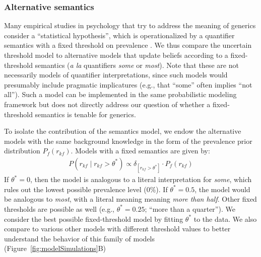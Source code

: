\documentclass[floatsintext,man]{apa6}
\newcommand{\ndg}[1]{{\textcolor{Green}{[ndg: #1]}}}
\begin{document}
\subsubsection{Alternative semantics}

Many empirical studies in psychology that try to address the meaning of generics consider a ``statistical hypothesis'', which is operationalized by a quantifier semantics with a fixed threshold on prevalence \cite{Prasada2006, Leslie2008, Cimpian2010, Khemlani2012, Prasada2013, Brandone2014}.
We thus compare the uncertain threshold model to alternative models that update beliefs according to a fixed-threshold semantics (\emph{a la} quantifiers \emph{some} or \emph{most}). 
Note that these are not necessarily models of quantifier interpretations, since such models would presumably include pragmatic implicatures (e.g., that \enquote{some} often implies \enquote{not all}). Such a model can be implemented in the same probabilistic modeling framework \cite{Goodman2013} but does not directly address our question of whether a fixed-threshold semantics is tenable for generics.

To isolate the contribution of the semantics model,  we endow the alternative models with the same background knowledge in the form of the prevalence prior distribution \(P_f(r_{kf})\).
Models with a fixed semantics are given by:
\begin{eqnarray}
P (r_{kf} \mid r_{kf} >  \theta^*) \propto \delta_{[r_{kf} > \theta^*]} \cdot P_f(r_{kf})  \label{eq:L0fixed}
\end{eqnarray}
If $\theta^* = 0$, then the model is analogous to a literal interpretation for \emph{some}, which rules out the lowest possible prevalence level ($0\%$).
If $\theta^* = 0.5$, the model would be analogous to \emph{most}, with a literal meaning meaning \emph{more than half}. 
Other fixed thresholds are possible as well (e.g., $\theta^* = 0.25$; \enquote{more than a quarter}).
We consider the best possible fixed-threshold model by fitting $\theta^*$ to the data.
We also compare to various other models with different threshold values to better understand the behavior of this family of models (Figure~\ref{fig:modelSimulations}B)
\end{document}
